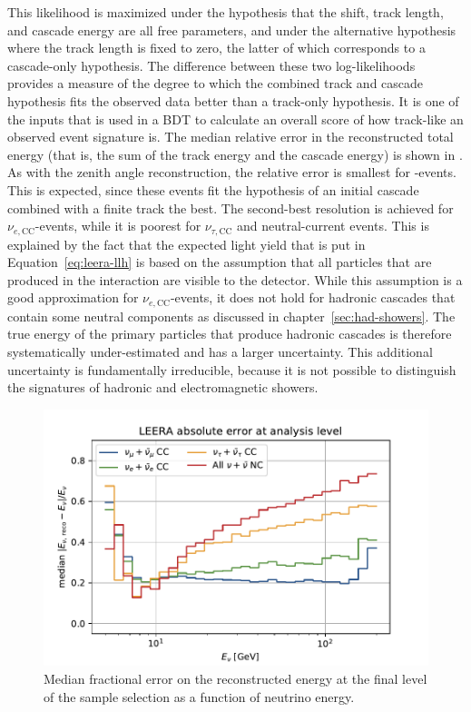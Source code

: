 This likelihood is maximized under the hypothesis that the shift, track length, and cascade energy are all free parameters, and under the alternative hypothesis where the track length is fixed to zero, the latter of which corresponds to a cascade-only hypothesis. The difference between these two log-likelihoods provides a measure of the degree to which the combined track and cascade hypothesis fits the observed data better than a track-only hypothesis. It is one of the inputs that is used in a BDT to calculate an overall score of how track-like an observed event signature is. The median relative error in the reconstructed total energy (that is, the sum of the track energy and the cascade energy) is shown in . As with the zenith angle reconstruction, the relative error is smallest for \numucc-events. This is expected, since these events fit the hypothesis of an initial cascade combined with a finite track the best. The second-best resolution is achieved for $\nu_{e,\mathrm{CC}}$-events, while it is poorest for $\nu_{\tau,\mathrm{CC}}$ and neutral-current events. This is explained by the fact that the expected light yield that is put in Equation~\ref{eq:leera-llh} is based on the assumption that all particles that are produced in the interaction are visible to the detector. While this assumption is a good approximation for $\nu_{e,\mathrm{CC}}$-events, it does not hold for hadronic cascades that contain some neutral components as discussed in chapter~\ref{sec:had-showers}. The true energy of the primary particles that produce hadronic cascades is therefore systematically under-estimated and has a larger uncertainty. This additional uncertainty is fundamentally irreducible, because it is not possible to distinguish the signatures of hadronic and electromagnetic showers.

\begin{figure}
    \centering
    \includegraphics[width=0.8\linewidth]{figures/icecube/reconstruction/leera/leera_absolute_error_final.pdf}
    \caption{Median fractional error on the reconstructed energy at the final level of the sample selection as a function of neutrino energy.}
    \label{fig:leera-resolution}
\end{figure}

